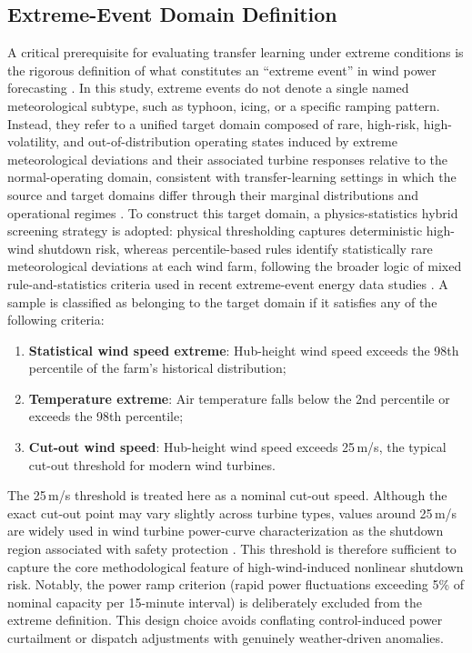 \subsection{Extreme-Event Domain Definition}\label{sec:extreme_def}

A critical prerequisite for evaluating transfer learning under extreme conditions is the rigorous definition of what constitutes an ``extreme event'' in wind power forecasting \citep{sideratos2012extreme, liu2024extreme}. In this study, extreme events do not denote a single named meteorological subtype, such as typhoon, icing, or a specific ramping pattern. Instead, they refer to a unified target domain composed of rare, high-risk, high-volatility, and out-of-distribution operating states induced by extreme meteorological deviations and their associated turbine responses relative to the normal-operating domain, consistent with transfer-learning settings in which the source and target domains differ through their marginal distributions and operational regimes \citep{pan2010survey, bendavid2010theory}. To construct this target domain, a physics-statistics hybrid screening strategy is adopted: physical thresholding captures deterministic high-wind shutdown risk, whereas percentile-based rules identify statistically rare meteorological deviations at each wind farm, following the broader logic of mixed rule-and-statistics criteria used in recent extreme-event energy data studies \citep{liu2023eweld}. A sample is classified as belonging to the target domain if it satisfies any of the following criteria:

\begin{enumerate}
    \item \textbf{Statistical wind speed extreme}: Hub-height wind speed exceeds the 98th percentile of the farm's historical distribution;
    \item \textbf{Temperature extreme}: Air temperature falls below the 2nd percentile or exceeds the 98th percentile;
    \item \textbf{Cut-out wind speed}: Hub-height wind speed exceeds 25\,m/s, the typical cut-out threshold for modern wind turbines.
\end{enumerate}

The 25\,m/s threshold is treated here as a nominal cut-out speed. Although the exact cut-out point may vary slightly across turbine types, values around 25\,m/s are widely used in wind turbine power-curve characterization as the shutdown region associated with safety protection \citep{rabanal2019midas}. This threshold is therefore sufficient to capture the core methodological feature of high-wind-induced nonlinear shutdown risk. Notably, the power ramp criterion (rapid power fluctuations exceeding 5\% of nominal capacity per 15-minute interval) is deliberately excluded from the extreme definition. This design choice avoids conflating control-induced power curtailment or dispatch adjustments with genuinely weather-driven anomalies.

